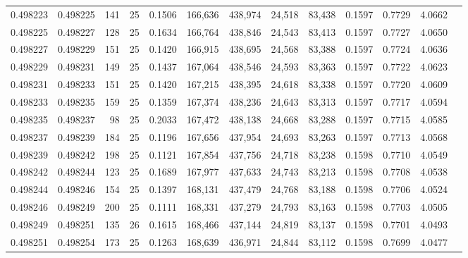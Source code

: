 \begin{tabular}{rrrrrrrrrrrrr}
0.498223 & 0.498225 & 141 &  25 &                                     0.1506 & 166,636 & 438,974 &  24,518 &  83,438 & 0.1597 & 0.7729 & 4.0662 \\
0.498225 & 0.498227 & 128 &  25 &                                     0.1634 & 166,764 & 438,846 &  24,543 &  83,413 & 0.1597 & 0.7727 & 4.0650 \\
0.498227 & 0.498229 & 151 &  25 &                                     0.1420 & 166,915 & 438,695 &  24,568 &  83,388 & 0.1597 & 0.7724 & 4.0636 \\
0.498229 & 0.498231 & 149 &  25 &                                     0.1437 & 167,064 & 438,546 &  24,593 &  83,363 & 0.1597 & 0.7722 & 4.0623 \\
0.498231 & 0.498233 & 151 &  25 &                                     0.1420 & 167,215 & 438,395 &  24,618 &  83,338 & 0.1597 & 0.7720 & 4.0609 \\
0.498233 & 0.498235 & 159 &  25 &                                     0.1359 & 167,374 & 438,236 &  24,643 &  83,313 & 0.1597 & 0.7717 & 4.0594 \\
0.498235 & 0.498237 &  98 &  25 &                                     0.2033 & 167,472 & 438,138 &  24,668 &  83,288 & 0.1597 & 0.7715 & 4.0585 \\
0.498237 & 0.498239 & 184 &  25 &                                     0.1196 & 167,656 & 437,954 &  24,693 &  83,263 & 0.1597 & 0.7713 & 4.0568 \\
0.498239 & 0.498242 & 198 &  25 &                                     0.1121 & 167,854 & 437,756 &  24,718 &  83,238 & 0.1598 & 0.7710 & 4.0549 \\
0.498242 & 0.498244 & 123 &  25 &                                     0.1689 & 167,977 & 437,633 &  24,743 &  83,213 & 0.1598 & 0.7708 & 4.0538 \\
0.498244 & 0.498246 & 154 &  25 &                                     0.1397 & 168,131 & 437,479 &  24,768 &  83,188 & 0.1598 & 0.7706 & 4.0524 \\
0.498246 & 0.498249 & 200 &  25 &                                     0.1111 & 168,331 & 437,279 &  24,793 &  83,163 & 0.1598 & 0.7703 & 4.0505 \\
0.498249 & 0.498251 & 135 &  26 &                                     0.1615 & 168,466 & 437,144 &  24,819 &  83,137 & 0.1598 & 0.7701 & 4.0493 \\
0.498251 & 0.498254 & 173 &  25 &                                     0.1263 & 168,639 & 436,971 &  24,844 &  83,112 & 0.1598 & 0.7699 & 4.0477 \\

\end{tabular}
